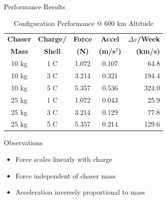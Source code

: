\documentclass[aspectratio=169]{beamer}
\begin{document}
\begin{frame}{Performance Results}
\begin{table}
\centering
\caption{Configuration Performance @ 600 km Altitude}
\small
\begin{tabular}{ccccr}
\toprule
\textbf{Chaser} & \textbf{Charge/} & \textbf{Force} & \textbf{Accel} & \textbf{$\Delta v$/Week} \\
\textbf{Mass} & \textbf{Shell} & \textbf{(N)} & \textbf{(m/s$^2$)} & \textbf{(km/s)} \\
\midrule
10 kg & 1 C & 1.072 & 0.107 & 64.8 \\
10 kg & 3 C & 3.214 & 0.321 & 194.4 \\
10 kg & 5 C & 5.357 & 0.536 & 324.0 \\
\midrule
25 kg & 1 C & 1.072 & 0.043 & 25.9 \\
25 kg & 3 C & 3.214 & 0.129 & 77.8 \\
25 kg & 5 C & 5.357 & 0.214 & 129.6 \\
\bottomrule
\end{tabular}
\end{table}

\begin{block}{Observations}
\begin{itemize}
    \item Force scales linearly with charge
    \item Force independent of chaser mass
    \item Acceleration inversely proportional to mass
\end{itemize}
\end{block}
\end{frame}
\end{document}

